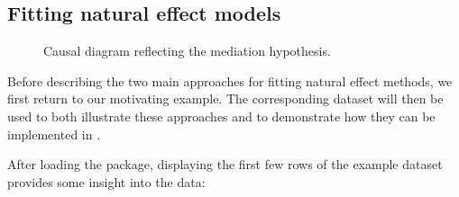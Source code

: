 \documentclass[nojss]{jss}
\begin{document}
\subsection[]{Fitting natural effect models}
\begin{figure}[b]
  \small
  \centering
  \caption{Causal diagram reflecting the mediation hypothesis. \label{dag1}}
\end{figure} 
Before describing the two main approaches for fitting natural effect methods, we first return to our motivating example. The corresponding dataset will then be used to both illustrate these approaches and to demonstrate how they can be implemented in .
\par After loading the  package, displaying the first few rows of the example dataset  provides some insight into the data:
\end{document}
